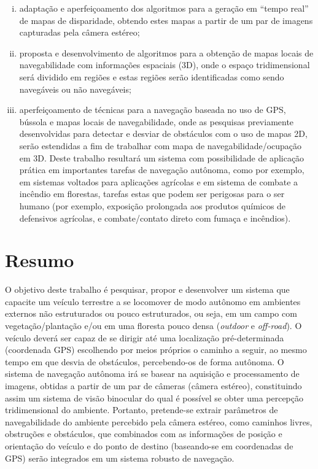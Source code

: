 \documentclass{article}
\begin{document}
\begin{enumerate}[i.]

\item adaptação e aperfeiçoamento dos algoritmos para a geração em “tempo real”
de mapas de disparidade, obtendo estes mapas a partir de um par de imagens
capturadas pela câmera estéreo;

\item proposta e desenvolvimento de algoritmos para a obtenção de mapas locais
de navegabilidade com informações espaciais (3D), onde o espaço tridimensional
será dividido em regiões e estas regiões serão identificadas como sendo
navegáveis ou não navegáveis;

\item aperfeiçoamento de técnicas para a navegação baseada no uso de GPS,
bússola e mapas locais de navegabilidade, onde as pesquisas previamente
desenvolvidas para detectar e desviar de obstáculos com o uso de mapas 2D, serão
estendidas a fim de trabalhar com mapa de navegabilidade/ocupação em 3D. Deste
trabalho resultará um sistema com possibilidade de aplicação prática em
importantes tarefas de navegação autônoma, como por exemplo, em sistemas
voltados para aplicações agrícolas e em sistema de combate a incêndio em
florestas, tarefas estas que podem ser perigosas para o ser humano (por exemplo,
exposição prolongada aos produtos químicos de defensivos agrícolas, e
combate/contato direto com fumaça e incêndios).

\end{enumerate}









\section{Resumo}

O objetivo deste trabalho é pesquisar, propor e desenvolver um sistema que
capacite um veículo terrestre a se locomover de modo autônomo em ambientes
externos não estruturados ou pouco estruturados, ou seja, em um campo com
vegetação/plantação e/ou em uma floresta pouco densa (\textit{outdoor} e
\textit{off-road}). O veículo deverá ser capaz de se dirigir até uma localização
pré-determinada (coordenada GPS) escolhendo por meios próprios o caminho a
seguir, ao mesmo tempo em que desvia de obstáculos, percebendo-os de forma
autônoma. O sistema de navegação autônoma irá se basear na aquisição e
processamento de imagens, obtidas a partir de um par de câmeras (câmera
estéreo), constituindo assim um sistema de visão binocular do qual é possível se
obter uma percepção tridimensional do ambiente. Portanto, pretende-se extrair
parâmetros de navegabilidade do ambiente percebido pela câmera estéreo, como
caminhos livres, obstruções e obstáculos, que combinados com as informações de
posição e orientação do veículo e do ponto de destino (baseando-se em
coordenadas de GPS) serão integrados em um sistema robusto de navegação.
\end{document}
